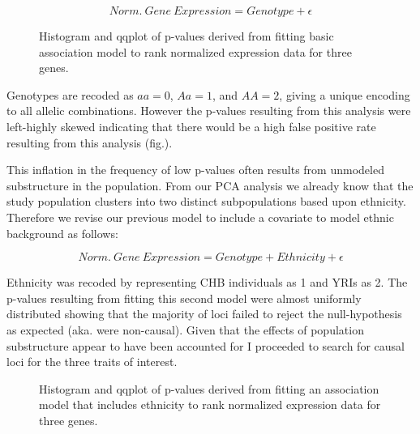 \documentclass[12pt,a4paper]{article}
\begin{document}
$$
	Norm.~Gene~Expression = Genotype + \epsilon
$$

\begin{figure}
\hfill
{}\hfill
{}
\caption{Histogram and qqplot of p-values derived from fitting basic association model to rank normalized expression data for three genes.}
\label{norm_assoc}
\end{figure}   


Genotypes are recoded as $aa=0$, $Aa=1$, and $AA=2$, giving a unique encoding to all allelic combinations. However the p-values resulting from this analysis were left-highly skewed indicating that there would be a high false positive rate resulting from this analysis (fig.). 


This inflation in the frequency of low p-values often results from unmodeled substructure in the population. From our PCA analysis we already know that the study population clusters into two distinct subpopulations based upon ethnicity. Therefore we revise our previous model to include a covariate to model ethnic background as follows: 

$$
	Norm.~Gene~Expression = Genotype + Ethnicity +\epsilon
$$

Ethnicity was recoded by representing CHB individuals as 1 and YRIs as 2. The p-values resulting from fitting this second model were almost uniformly distributed showing that the majority of loci failed to reject the null-hypothesis as expected (aka. were non-causal). Given that the effects of population substructure appear to have been accounted for I proceeded to search for causal loci for the three traits of interest. 

\begin{figure}
\hfill
{}\hfill
{}
\caption{Histogram and qqplot of p-values derived from fitting an association model that includes ethnicity to rank normalized expression data for three genes.}
\label{covar_pp}
\end{figure}
\end{document}
